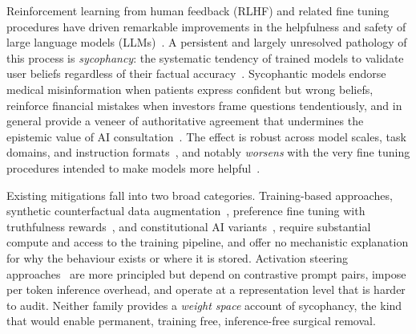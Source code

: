 \documentclass{article}
\begin{document}
Reinforcement learning from human feedback (RLHF) and related
fine tuning procedures have driven remarkable improvements in the
helpfulness and safety of large language models
(LLMs)~\citep{ouyangTrainingLanguageModels2022,
baiTrainingHelpfulHarmless2022,
rafailovDirectPreferenceOptimization2023}.
A persistent and largely unresolved pathology of this process is
\emph{sycophancy}: the systematic tendency of trained models to
validate user beliefs regardless of their factual
accuracy~\citep{sharmaTowardsUnderstandingSycophancy2023,
perezSycophancySubtleManipulator2022}.
Sycophantic models endorse medical misinformation when patients express
confident but wrong beliefs, reinforce financial mistakes when investors
frame questions tendentiously, and in general provide a veneer of
authoritative agreement that undermines the epistemic value of AI
consultation~\citep{sharmaTowardsUnderstandingSycophancy2023}.
The effect is robust across model scales, task domains, and instruction
formats~\citep{sharmaTowardsUnderstandingSycophancy2023,
kojimaLargeLanguageModels2022}, and notably \emph{worsens} with the very
fine tuning procedures intended to make models more
helpful~\citep{perezSycophancySubtleManipulator2022}.

Existing mitigations fall into two broad categories. Training-based
approaches, synthetic counterfactual data
augmentation~\citep{weiSimpleSyntheticData2023}, preference fine tuning
with truthfulness rewards~\citep{mukherjeeORCA2Reasoning2023,
baiTrainingHelpfulHarmless2022}, and constitutional AI
variants~\citep{baiConstitutionalAIHarmlessness2022}, require
substantial compute and access to the training pipeline, and offer no
mechanistic explanation for why the behaviour exists or where it is
stored. Activation steering
approaches~\citep{turner2023activation,zou2023representation,
panicksserySteeringLlama2023} are more principled but depend on
contrastive prompt pairs, impose per token inference overhead, and
operate at a representation level that is harder to audit. Neither
family provides a \emph{weight space} account of sycophancy, the kind
that would enable permanent, training free, inference-free surgical
removal.
\end{document}
